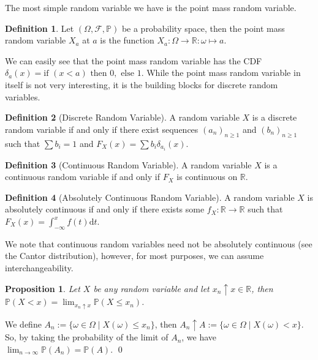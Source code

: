 \documentclass[
]{article}
\newtheorem{prop}{Proposition}[theorem]
\theoremstyle{definition}
\newtheorem{definition}{Definition}[section]
\begin{document}
The most simple random variable we have is the point mass random
variable.

\begin{definition}
  Let \((\Omega, \mathcal{F}, \mathbb{P})\) be a probability space, then the 
  point mass random variable \(X_a\) at \(a\) is the function 
  \(X_a : \Omega \to \mathbb{R} : \omega \mapsto a\).
\end{definition}

We can easily see that the point mass random variable has the CDF
\(\delta_a(x) = \text{if } (x < a) \text{ then } 0, \text{ else } 1\).
While the point mass random variable in itself is not very interesting,
it is the building blocks for discrete random variables.

\begin{definition}[Discrete Random Variable]
  A random variable \(X\) is a discrete random variable if and only if there 
  exist sequences \((a_n)_{n \ge 1}\) and \((b_n)_{n \ge 1}\) such that 
  \(\sum b_i = 1\) and \(F_X(x) = \sum b_i \delta_{a_i}(x)\).
\end{definition}

\begin{definition}[Continuous Random Variable]
  A random variable \(X\) is a continuous random variable if and only if \(F_X\) 
  is continuous on \(\mathbb{R}\).
\end{definition}

\begin{definition}[Absolutely Continuous Random Variable]
  A random variable \(X\) is absolutely continuous if and only if there exists 
  some \(f_X : \mathbb{R} \to \mathbb{R}\) such that 
  \(F_X(x) = \int_{-\infty}^x f(t) \text{d}t\).
\end{definition}

We note that continuous random variables need not be absolutely
continuous (see the Cantor distribution), however, for most purposes, we
can assume interchangeability.

\begin{prop}
  Let \(X\) be any random variable and let \(x_n \uparrow x \in \mathbb{R}\), 
  then \(\mathbb{P}(X < x) = \lim_{x_n \uparrow x} \mathbb{P}(X \le x_n)\).
\end{prop}
\proof

We define \(A_n := \{\omega \in \Omega \mid X(\omega) \le x_n\}\), then
\(A_n \uparrow A := \{\omega \in \Omega \mid X(\omega) < x\}\). So, by
taking the probability of the limit of \(A_n\), we have
\(\lim_{n \to \infty} \mathbb{P}(A_n) = \mathbb{P}(A)\). \qed
\end{document}
